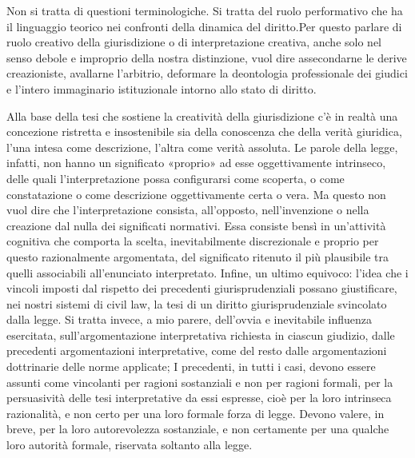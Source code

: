 Non si tratta di questioni terminologiche. Si tratta del ruolo performativo che ha il linguaggio teorico nei confronti della dinamica del diritto.Per questo parlare di ruolo creativo della giurisdizione o di interpretazione creativa, anche solo nel senso debole e improprio della nostra distinzione, vuol dire assecondarne le derive creazioniste, avallarne l’arbitrio, deformare la deontologia professionale dei giudici e l’intero immaginario istituzionale intorno allo stato di diritto. 

Alla base della tesi che sostiene la creatività della giurisdizione c’è in realtà una concezione ristretta e insostenibile sia della conoscenza che della verità giuridica, l’una intesa come descrizione, l’altra come verità assoluta. 
Le parole della legge, infatti, non hanno un significato «proprio» ad esse oggettivamente intrinseco, delle quali l’interpretazione possa configurarsi come scoperta, o come constatazione o come descrizione oggettivamente certa o vera. Ma questo non vuol dire che l’interpretazione consista, all’opposto, nell’invenzione o nella creazione dal nulla dei significati normativi. 
Essa consiste bensì in un’attività cognitiva che comporta la scelta, inevitabilmente discrezionale e proprio per questo razionalmente argomentata, del significato ritenuto il più plausibile tra quelli associabili all’enunciato interpretato. 
Infine, un ultimo equivoco: l’idea che i vincoli imposti dal rispetto dei precedenti giurisprudenziali possano giustificare, nei nostri sistemi di civil law, la tesi di un diritto giurisprudenziale svincolato dalla legge. Si tratta invece, a mio parere, dell’ovvia e inevitabile influenza esercitata, sull’argomentazione interpretativa richiesta in ciascun giudizio, dalle precedenti argomentazioni interpretative, come del resto dalle argomentazioni dottrinarie delle norme applicate; I precedenti, in tutti i casi, devono essere assunti come vincolanti per ragioni sostanziali e non per ragioni formali, per la persuasività delle tesi interpretative da essi espresse, cioè per la loro intrinseca razionalità, e non certo per una loro formale forza di legge. Devono valere, in breve, per la loro autorevolezza sostanziale, e non certamente per una qualche loro autorità formale, riservata soltanto alla legge.

